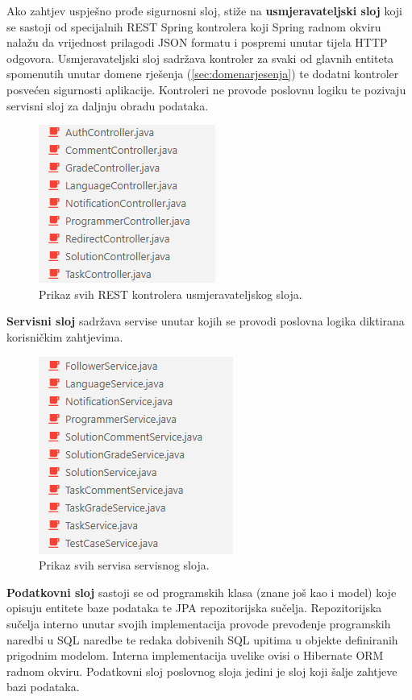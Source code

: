 \documentclass[times, utf8, zavrsni, numeric]{fer}
\begin{document}
	 		Ako zahtjev uspješno prođe sigurnosni sloj, stiže na \textbf{usmjeravateljski sloj} koji se sastoji od specijalnih REST Spring kontrolera koji Spring radnom okviru nalažu da vrijednost prilagodi JSON formatu i pospremi unutar tijela HTTP odgovora. Usmjeravateljski sloj sadržava kontroler za svaki od glavnih entiteta spomenutih unutar domene rješenja (\ref{sec:domenarjesenja}) te dodatni kontroler posvećen sigurnosti aplikacije. Kontroleri ne provode poslovnu logiku te pozivaju servisni sloj za daljnju obradu podataka. 
	 		\begin{figure}[H]
	 			\centering
	 			\includegraphics[scale=0.75]{pictures/prikazi/Controllers.png}
	 			\caption{Prikaz svih REST kontrolera usmjeravateljskog sloja.}
	 			\label{fig:controllers}
	 		\end{figure}
 		
	 		\textbf{Servisni sloj} sadržava servise unutar kojih se provodi poslovna logika diktirana korisničkim zahtjevima.
	 		\begin{figure}[H]
	 			\centering
	 			\includegraphics[scale=0.75]{pictures/prikazi/Services.png}
	 			\caption{Prikaz svih servisa servisnog sloja.}
	 			\label{fig:services}
	 		\end{figure}
 		
	 		\textbf{Podatkovni sloj} sastoji se od programskih klasa (znane još kao i model) koje opisuju entitete baze podataka te JPA repozitorijska  sučelja. Repozitorijska sučelja interno unutar svojih implementacija provode prevođenje programskih naredbi u SQL naredbe te redaka dobivenih SQL upitima u objekte definiranih prigodnim modelom. Interna implementacija uvelike ovisi o Hibernate ORM radnom okviru. Podatkovni sloj poslovnog sloja jedini je sloj koji šalje zahtjeve bazi podataka.
			
\end{document}
